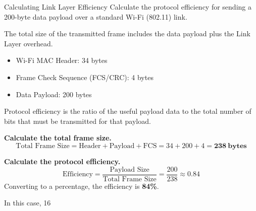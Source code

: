 \begin{workedexample}{Calculating Link Layer Efficiency}
    Calculate the protocol efficiency for sending a 200-byte data payload over a standard Wi-Fi (802.11) link.
    
    The total size of the transmitted frame includes the data payload plus the Link Layer overhead.
    \begin{itemize}
        \item Wi-Fi MAC Header: 34 bytes
        \item Frame Check Sequence (FCS/CRC): 4 bytes
        \item Data Payload: 200 bytes
    \end{itemize}

    Protocol efficiency is the ratio of the useful payload data to the total number of bits that must be transmitted for that payload.
    
    \begin{derivationsteps}
        \step \textbf{Calculate the total frame size.}
        \[ \text{Total Frame Size} = \text{Header} + \text{Payload} + \text{FCS} = 34 + 200 + 4 = \mathbf{238~\text{bytes}} \]
        
        \step \textbf{Calculate the protocol efficiency.}
        \[ \text{Efficiency} = \frac{\text{Payload Size}}{\text{Total Frame Size}} = \frac{200}{238} \approx 0.84 \]
        Converting to a percentage, the efficiency is \textbf{84\%}.
    \end{derivationsteps}

    In this case, 16%
\end{workedexample}

